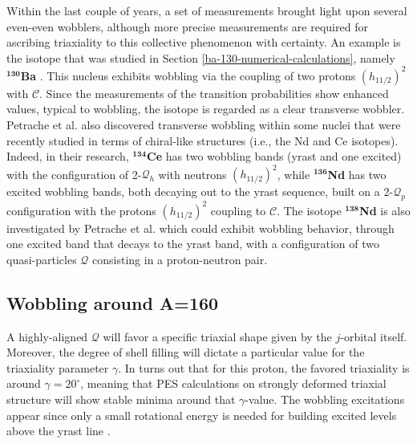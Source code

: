 Within the last couple of years, a set of measurements brought light upon several even-even wobblers, although more precise measurements are required for ascribing triaxiality to this collective phenomenon with certainty. An example is the isotope that was studied in Section \ref{ba-130-numerical-calculations}, namely $^\mathbf{130}$\textbf{Ba} \cite{petrache2019diversity,chen2019transverse,wang2020two}. This nucleus exhibits wobbling via the coupling of two protons $(h_{11/2})^2$ with $\mathscr{C}$. Since the measurements of the transition probabilities show enhanced values, typical to wobbling, the isotope is regarded as a clear transverse wobbler. Petrache et al. \cite{petrache2016transverse} also discovered transverse wobbling within some nuclei that were recently studied in terms of chiral-like structures (i.e., the Nd and Ce isotopes). Indeed, in their research, $^\mathbf{134}$\textbf{Ce} has two wobbling bands (yrast and one excited) with the configuration of 2-$\mathcal{Q}_h$ with neutrons $(h_{11/2})^2$, while $^\mathbf{136}$\textbf{Nd} has two excited wobbling bands, both decaying out to the yrast sequence, built on a 2-$\mathcal{Q}_p$ configuration with the protons $(h_{11/2})^2$ coupling to $\mathscr{C}$. The isotope $^\mathbf{138}$\textbf{Nd} is also investigated by Petrache et al. \cite{petrache2012tilted} which could exhibit wobbling behavior, through one excited band that decays to the yrast band, with a configuration of two quasi-particles $\mathcal{Q}$ consisting in a proton-neutron pair.

\subsection{Wobbling around A=160}

A highly-aligned $\mathcal{Q}$ will favor a specific triaxial shape \cite{hamamoto1983intrinsic} given by the $j$-orbital itself. Moreover, the degree of shell filling will dictate a particular value for the triaxiality parameter $\gamma$. In turns out that for this proton, the favored triaxiality is around $\gamma=20^\circ$, meaning that PES calculations on strongly deformed triaxial structure will show stable minima around that $\gamma$-value. The wobbling excitations appear since only a small rotational energy is needed for building excited levels above the yrast line \cite{hamamoto2016interplay}.

